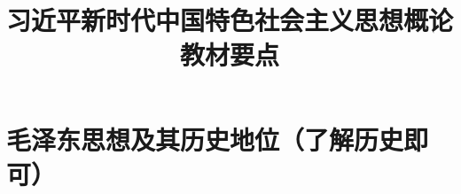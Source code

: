 \documentclass[a4paper, UTF8]{ctexart}
\title{\huge{\heiti 习近平新时代中国特色社会主义思想概论\protect\\教材要点}}
\author{}
\date{}
\begin{document}
\maketitle

\section{毛泽东思想及其历史地位（了解历史即可）}
\end{document}
